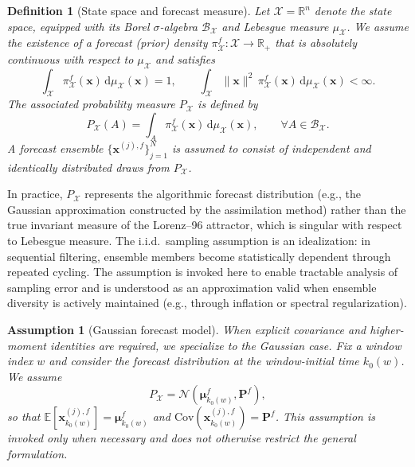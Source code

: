 \documentclass[11pt,a4paper]{article}
\newtheorem{definition}{Definition}
\newtheorem{assumption}{Assumption}
\begin{document}
\begin{definition}[State space and forecast measure]
\label{def:parameter_space}
Let $\mathcal{X}=\mathbb{R}^n$ denote the state space, equipped with its Borel $\sigma$-algebra $\mathcal{B}_{\mathcal{X}}$ and Lebesgue measure $\mu_{\mathcal{X}}$. We assume the existence of a forecast (prior) density $\pi_{\mathcal{X}}^{f}:\mathcal{X}\to\mathbb{R}_{+}$ that is absolutely continuous with respect to $\mu_{\mathcal{X}}$ and satisfies
\begin{equation}
\int_{\mathcal{X}}\pi_{\mathcal{X}}^{f}(\mathbf{x})\,\mathrm{d}\mu_{\mathcal{X}}(\mathbf{x})=1,
\qquad
\int_{\mathcal{X}}\|\mathbf{x}\|^{2}\,\pi_{\mathcal{X}}^{f}(\mathbf{x})\,\mathrm{d}\mu_{\mathcal{X}}(\mathbf{x})<\infty.
\end{equation}
The associated probability measure $P_{\mathcal{X}}$ is defined by
\begin{equation}
P_{\mathcal{X}}(A)
=
\int_A \pi_{\mathcal{X}}^{f}(\mathbf{x})\,\mathrm{d}\mu_{\mathcal{X}}(\mathbf{x}),
\qquad
\forall A\in\mathcal{B}_{\mathcal{X}}.
\end{equation}
A forecast ensemble $\{\mathbf{x}^{(j),f}\}_{j=1}^N$ is assumed to consist of independent and identically distributed draws from $P_{\mathcal{X}}$.
\end{definition}


In practice, $P_{\mathcal{X}}$ represents the algorithmic forecast distribution (e.g., the Gaussian approximation constructed by the assimilation method) rather than the true invariant measure of the Lorenz--96 attractor, which is singular with respect to Lebesgue measure. The i.i.d.\ sampling assumption is an idealization: in sequential filtering, ensemble members become statistically dependent through repeated cycling. The assumption is invoked here to enable tractable analysis of sampling error and is understood as an approximation valid when ensemble diversity is actively maintained (e.g., through inflation or spectral regularization).
\par\smallskip

\begin{assumption}[Gaussian forecast model]
\label{ass:gaussian_forecast}
When explicit covariance and higher-moment identities are required, we specialize to the Gaussian case. Fix a window index $w$ and consider the forecast distribution at the window-initial time $k_0(w)$. We assume
\begin{equation}
P_{\mathcal{X}}=\mathcal{N}(\boldsymbol{\mu}_{k_0(w)}^{f},\mathbf{P}^{f}),
\end{equation}
so that $\mathbb{E}[\mathbf{x}_{k_0(w)}^{(j),f}]=\boldsymbol{\mu}_{k_0(w)}^{f}$ and $\mathrm{Cov}(\mathbf{x}_{k_0(w)}^{(j),f})=\mathbf{P}^{f}$.
This assumption is invoked only when necessary and does not otherwise restrict the general formulation.
\end{assumption}
\end{document}

